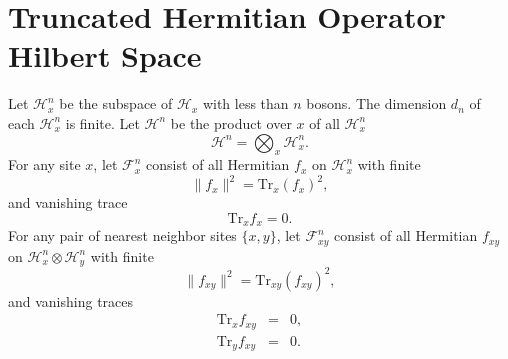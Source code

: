 \documentclass[twocolumn,amsmath,amssymb]{revtex4-1}
\begin{document}
{}



\appendix

\section{\label{app:operatorspace} Truncated Hermitian Operator Hilbert Space}



Let $\mathcal{H}_x^n$ be the subspace of $\mathcal{H}_x$ with
less than $n$ bosons. The dimension $d_n$ of
each $\mathcal{H}_x^n$ is finite.
Let
$\mathcal{H}^n$ be the product over $x$ of all
$\mathcal{H}^n_x$
\begin{equation}
  \label{defPn}
  \mathcal{H}^n = \bigotimes_x \mathcal{H}_x^n.
  \end{equation}
For any site $x$, let $\mathcal{F}^n_x$ consist of all Hermitian $f_x$ on
$\mathcal{H}^n_x$ with finite
\begin{equation}
  \label{normfx}
  \parallel f_x \parallel ^ 2 = \mathrm{Tr}_x( f_x)^2,
\end{equation}
and vanishing trace 
\begin{equation}
  \label{trx0}
  \mathrm{Tr}_x f_x  = 0.
\end{equation}
For any pair of nearest neighbor sites $\{x, y\}$, let $\mathcal{F}^n_{xy}$ consist of all Hermitian $f_{xy}$ on
$\mathcal{H}^n_x \otimes \mathcal{H}^n_y$ with finite
\begin{equation}
  \label{normfxy}
  \parallel f_{xy} \parallel ^ 2 = \mathrm{Tr}_{xy}( f_{xy})^2,
\end{equation}
and vanishing traces 
\begin{subequations}
\begin{eqnarray}
  \label{trx1}
  \mathrm{Tr}_x f_{xy}  &=& 0, \\
  \label{try1}
  \mathrm{Tr}_y f_{xy}  &=& 0.
\end{eqnarray}
\end{subequations}
\end{document}
